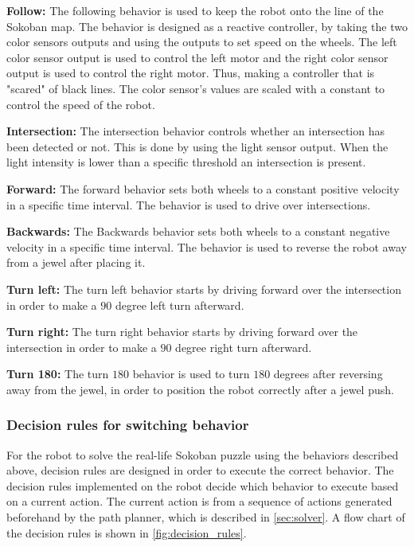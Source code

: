 \documentclass[../report.tex]{subfiles}
\begin{document}
\textbf{Follow:} The following behavior is used to keep the robot onto the line of the Sokoban map. The behavior is designed as a reactive controller, by taking the two color sensors outputs and using the outputs to set speed on the wheels. The left color sensor output is used to control the left motor and the right color sensor output is used to control the right motor. Thus, making a controller that is "scared" of black lines. The color sensor's values are scaled with a constant to control the speed of the robot.

\textbf{Intersection:} The intersection behavior controls whether an intersection has been detected or not. This is done by using the light sensor output. When the light intensity is lower than a specific threshold an intersection is present.

\textbf{Forward:} The forward behavior sets both wheels to a constant positive velocity in a specific time interval. The behavior is used to drive over intersections.

\textbf{Backwards:} The Backwards behavior sets both wheels to a constant negative velocity in a specific time interval. The behavior is used to reverse the robot away from a jewel after placing it.  

\textbf{Turn left:} The turn left behavior starts by driving forward over the intersection in order to make a $90$ degree left turn afterward.

\textbf{Turn right:} The turn right behavior starts by driving forward over the intersection in order to make a $90$ degree right turn afterward.

\textbf{Turn 180:} The turn $180$ behavior is used to turn $180$ degrees after reversing away from the jewel, in order to position the robot correctly after a jewel push. 

\subsubsection{Decision rules for switching behavior}
For the robot to solve the real-life Sokoban puzzle using the behaviors described above, decision rules are designed in order to execute the correct behavior. The decision rules implemented on the robot decide which behavior to execute based on a current action. The current action is from a sequence of actions generated beforehand by the path planner, which is described in \autoref{sec:solver}. A flow chart of the decision rules is shown in \autoref{fig:decision_rules}.
\end{document}
